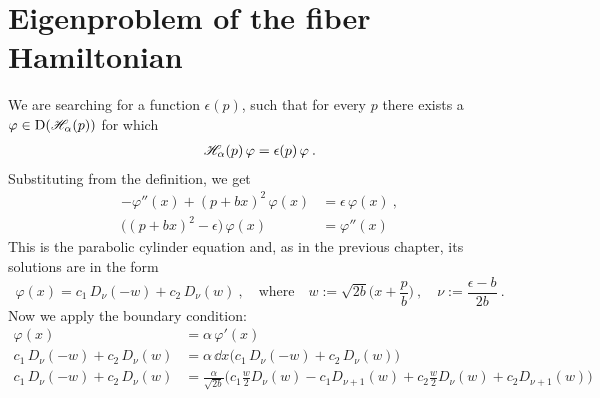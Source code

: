 \section{Eigenproblem of the fiber Hamiltonian}
We are searching for a function $\epsilon(p)$, such that for every $p$ there exists a $\varphi \in \mathrm{D}(\mathscr{H}_\alpha(p))$ for which
\begin{align*}
    \mathscr{H}_\alpha(p) \, \varphi = \epsilon(p) \, \varphi
    \: .
\end{align*}
Substituting from the definition, we get
\begin{align*}
    -\varphi''(x) + (p + bx)^2 \, \varphi(x)
    &= \epsilon \, \varphi(x)
    \: , \\
    \big( (p + bx)^2 - \epsilon \big) \, \varphi(x)
    &= \varphi''(x)
\end{align*}
This is the parabolic cylinder equation and, as in the previous chapter, its solutions are in the form
\begin{equation*}
    \varphi(x) = c_1 \, D_\nu(-w) + c_2 \, D_\nu(w)
    \: ,
    \quad \text{where} \quad
    w := \sqrt{2b} \big( x + \frac{p}{b} \big)
    \: , \quad
    \nu := \frac{\epsilon - b}{2b}
    \: .
\end{equation*}
Now we apply the boundary condition:
\begin{align*}
    \varphi(x) &= \alpha \, \varphi'(x)
    \\
    c_1 \, D_\nu(-w) + c_2 \, D_\nu(w)
    &= \alpha \, \dd{}{x} \big(
        c_1 \, D_\nu(-w) + c_2 \, D_\nu(w)
    \big)
    \\
    c_1 \, D_\nu(-w) + c_2 \, D_\nu(w)
    &= \tfrac{\alpha}{\!\!\sqrt{2b}} \big(
        c_1 \tfrac{w}{2} D_\nu(w)
        - c_1 D_{\nu+1}(w)
        + c_2 \tfrac{w}{2} D_\nu(w)
        + c_2 D_{\nu+1}(w)
    \big)
\end{align*}
